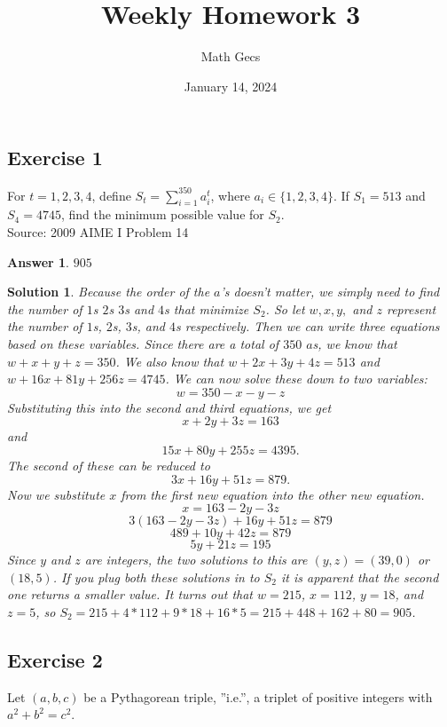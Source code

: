 \documentclass[12pt]{article}
\title{Weekly Homework 3}
\author{Math Gecs}
\date{January 14, 2024}
\newtheorem{answer}{Answer}
\newtheorem{solution}{Solution}
\begin{document}
\maketitle

\subsection*{Exercise 1}
For $t = 1, 2, 3, 4$, define $S_t = \sum_{i = 1}^{350}a_i^t$, where $a_i \in \{1,2,3,4\}$. If $S_1 = 513$ and $S_4 = 4745$, find the minimum possible value for $S_2$. \\

Source: 2009 AIME I Problem 14

\begin{answer}
$905$
\end{answer}


\begin{solution}
Because the order of the $a$'s doesn't matter, we simply need to find the number of $1$s $2$s $3$s and $4$s that minimize $S_2$. So let $w, x, y,$ and $z$ represent the number of $1$s, $2$s, $3$s, and $4$s respectively. Then we can write three equations based on these variables. Since there are a total of $350$ $a$s, we know that $w + x + y + z = 350$. We also know that $w + 2x + 3y + 4z = 513$ and $w + 16x + 81y + 256z = 4745$. We can now solve these down to two variables:
$$w = 350 - x - y - z$$
Substituting this into the second and third equations, we get
$$x + 2y + 3z = 163$$
and
$$15x + 80y + 255z = 4395.$$
The second of these can be reduced to 
$$3x + 16y + 51z = 879.$$
Now we substitute $x$ from the first new equation into the other new equation.
$$x = 163 - 2y - 3z$$
$$3(163 - 2y - 3z) + 16y + 51z = 879$$
$$489 + 10y + 42z = 879$$
$$5y + 21z = 195$$
Since $y$ and $z$ are integers, the two solutions to this are $(y,z) = (39,0)$ or $(18,5)$.
If you plug both these solutions in to $S_2$ it is apparent that the second one returns a smaller value. It turns out that $w = 215$, $x = 112$, $y = 18$, and $z = 5$, so $S_2 = 215 + 4*112 + 9*18 + 16*5 = 215 + 448 + 162 + 80 = \boxed{905}$.

\end{solution}




\subsection*{Exercise 2}
Let $(a,b,c)$ be a Pythagorean triple, ''i.e.'', a triplet of positive integers with ${a}^2+{b}^2={c}^2$.
\end{document}

